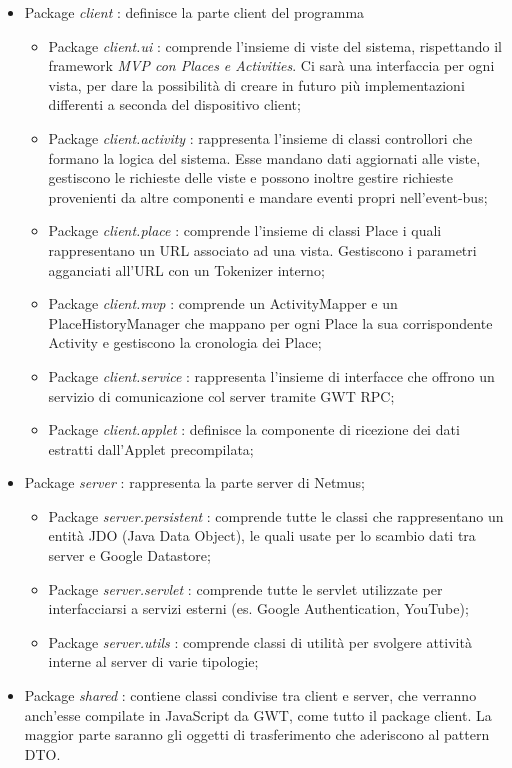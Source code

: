 \begin{itemize}
  \item Package \emph{client} : definisce la parte client del programma
  \begin {itemize}
    \item Package \emph{client.ui} : comprende l'insieme di viste del sistema,
    rispettando il framework \emph{MVP con Places e Activities}. Ci sar\`a una
    interfaccia per ogni vista, per dare la possibilit\`a di creare in futuro
    pi\`u implementazioni differenti a seconda del dispositivo client;
    \item Package \emph{client.activity} : rappresenta l'insieme di classi
    controllori che formano la logica del sistema. Esse mandano dati aggiornati alle
    viste, gestiscono le richieste delle viste e possono inoltre gestire
    richieste provenienti da altre componenti e mandare eventi propri nell'event-bus;
    \item Package \emph{client.place} : comprende l'insieme di classi Place i
    quali rappresentano un URL associato ad una vista. Gestiscono i parametri
    agganciati all'URL con un Tokenizer interno;
    \item Package \emph{client.mvp} : comprende un ActivityMapper e
    un PlaceHistoryManager che mappano per ogni Place la sua corrispondente
    Activity e gestiscono la cronologia dei Place;
    \item Package \emph{client.service} : rappresenta l'insieme di interfacce
    che offrono un servizio di comunicazione col server tramite GWT RPC;
    \item Package \emph{client.applet} : definisce la componente di
    ricezione dei dati estratti dall'Applet precompilata;
  \end {itemize}
  \item Package \emph{server} : rappresenta la parte server di Netmus;
  \begin{itemize}
    \item Package \emph{server.persistent} : comprende tutte le classi che
    rappresentano un entit\`a JDO (Java Data Object), le quali usate per lo scambio dati tra
    server e Google Datastore;
    \item Package \emph{server.servlet} : comprende tutte le servlet utilizzate
    per interfacciarsi a servizi esterni (es. Google Authentication, YouTube);
    \item Package \emph{server.utils} : comprende classi di utilit\`a per
    svolgere attivit\`a interne al server di varie tipologie;
  \end{itemize}
  \item Package \emph{shared} :  contiene classi condivise tra client e server,
  che verranno anch'esse compilate in JavaScript da GWT, come tutto il package
  client. La maggior parte saranno gli oggetti di trasferimento che
  aderiscono al pattern DTO.
\end{itemize}

